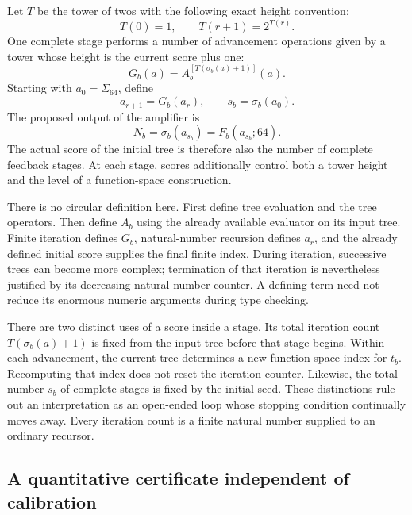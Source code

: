 Let $T$ be the tower of twos with the following exact height convention:
\[
 T(0)=1,\qquad T(r+1)=2^{T(r)}.
\]
One complete stage performs a number of advancement operations given by a
tower whose height is the current score plus one:
\begin{equation}
 G_b(a)=A_b^{[T(\sigma_b(a)+1)]}(a).
 \label{amp:eq:stage}
\end{equation}
Starting with $a_0=\Sigma_{64}$, define
\[
 a_{r+1}=G_b(a_r),\qquad s_b=\sigma_b(a_0).
\]
The proposed output of the amplifier is
\begin{equation}
 \boxed{N_b=\sigma_b(a_{s_b})=F_b(a_{s_b};64).}
 \label{amp:eq:candidate}
\end{equation}
The actual score of the initial tree is therefore also the number of
complete feedback stages.  At each stage, scores additionally control both
a tower height and the level of a function-space construction.

There is no circular definition here.  First define tree evaluation and
the tree operators.  Then define $A_b$ using the already available evaluator
on its input tree.  Finite iteration defines $G_b$, natural-number recursion
defines $a_r$, and the already defined initial score supplies the final
finite index.  During iteration, successive trees can become more complex;
termination of that iteration is nevertheless justified by its decreasing
natural-number counter.  A defining term need not reduce its enormous
numeric arguments during type checking.

There are two distinct uses of a score inside a stage.  Its total iteration
count $T(\sigma_b(a)+1)$ is fixed from the input tree before that stage
begins.  Within each advancement, the current tree determines a new
function-space index for $t_b$.  Recomputing that index does not reset the
iteration counter.  Likewise, the total number $s_b$ of complete stages is
fixed by the initial seed.  These distinctions rule out an interpretation
as an open-ended loop whose stopping condition continually moves away.
Every iteration count is a finite natural number supplied to an ordinary
recursor.

\subsection{A quantitative certificate independent of calibration}
\label{amp:bounds}

